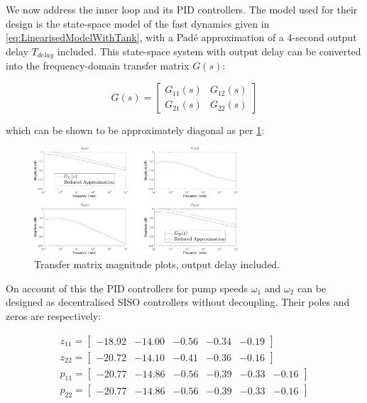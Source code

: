 We now address the inner loop and its PID controllers. The model used for their design is the state-space model of the fast dynamics given in \cref{eq:LinearisedModelWithTank}, with a Padé approximation of a $4$-second output delay $T_{delay}$ included. This state-space system with output delay can be converted into the frequency-domain transfer matrix $G(s)$:

\begin{equation}\label{eq:TransferMatrix}
	G(s) = \begin{bmatrix} G_{11}(s) & G_{12}(s) \\ G_{21}(s) & G_{22}(s)\end{bmatrix}
\end{equation}

which can be shown to be approximately diagonal as per \cref{fig:BodeMagDelayPlot}:

\begin{figure}[h!]
 	\centering
 	\includegraphics[width=\linewidth,height=4cm]{Graphics/PumpMagPlot.pdf}
 	\caption{Transfer matrix magnitude plots, output delay included.}
 	\label{fig:BodeMagDelayPlot}
\end{figure}

On account of this the PID controllers for pump speeds $\omega_1$ and $\omega_2$ can be designed as decentralised SISO controllers without decoupling. Their poles and zeros are respectively:

\begin{equation}\label{eq:PumpTFNumDen}
	\begin{gathered}
		z_{11} = \begin{bmatrix}-18.92 & -14.00 & -0.56 & -0.34 & -0.19	\end{bmatrix} \\
		z_{22} = \begin{bmatrix}-20.72 & -14.10 & -0.41 & -0.36 & -0.16	\end{bmatrix} \\
		p_{11} = \begin{bmatrix}-20.77 & -14.86 & -0.56 & -0.39 & -0.33 & -0.16\end{bmatrix} \\
		p_{22} = \begin{bmatrix}-20.77 & -14.86 & -0.56 & -0.39 & -0.33 & -0.16\end{bmatrix}
	\end{gathered}
\end{equation}


